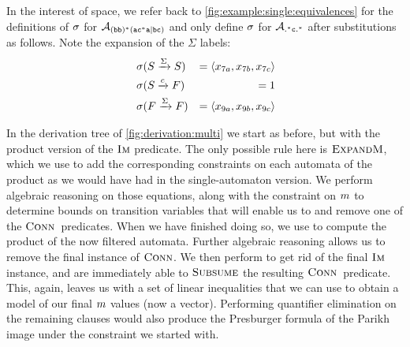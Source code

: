 \documentclass[acmsmall,review,anonymous,screen]{acmart}\settopmatter{printfolios=true,printccs=false,printacmref=true}
\theoremstyle{definition}
\begin{document}
In the interest of space, we refer back to
\cref{fig:example:single:equivalences} for the definitions of $\operatorname{\sigma}$ for
$\mathcal{A}_{\mathtt{(bb)^\ast(ac^\ast{}a|bc)}}$ and only define $\operatorname{\sigma}$ for $\mathcal{A}_{\mathtt{.^\ast{}c.^\ast}}{}$ after
substitutions as follows. Note the expansion of the $\Sigma$ labels:
    \begin{equation*}
      \begin{aligned}
        & \operatorname{\sigma}(S \xrightarrow{\Sigma} S) & = \left\langle x_{7a}, x_{7b}, x_{7c}\right\rangle \\
        & \operatorname{\sigma}(S \xrightarrow{c} F) & = 1 \\
        & \operatorname{\sigma}(F \xrightarrow{\Sigma} F) & = \left\langle x_{9a}, x_{9b}, x_{9c}\right\rangle \\
      \end{aligned}
    \end{equation*}
    
In the derivation tree of \cref{fig:derivation:multi} we start as before, but
with the product version of the $\operatorname{\textsc{Im}}$ predicate. The only possible rule here
is $\textsc{ExpandM}$, which we use to add the corresponding constraints on each
automata of the product as we would have had in the single-automaton version. We
perform algebraic reasoning on those equations, along with the constraint on
$m$ to determine bounds on transition variables that will enable us
to \Subsume{} and remove one of the $\operatorname{\textsc{Conn}}{}$ predicates. When we have
finished doing so, we use \Materialise{} to compute the product of the now
filtered automata. Further algebraic reasoning allows us to remove the final
instance of $\operatorname{\textsc{Conn}}$. We then perform \Expand{} to get rid of the final
$\operatorname{\textsc{Im}}$ instance, and are immediately able to $\textsc{Subsume}$ the resulting
$\operatorname{\textsc{Conn}}{}$ predicate. This, again, leaves us with a set of linear
inequalities that we can use to obtain a model of our final $m$
values (now a vector). Performing quantifier elimination on the remaining clauses would also produce the Presburger formula of the Parikh image under the constraint we started with.
\end{document}
